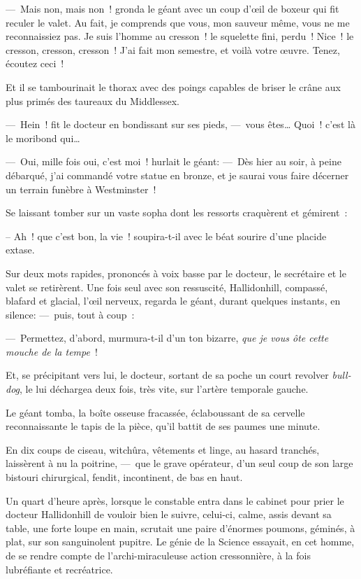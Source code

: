 \documentclass[french,twoside]{book} %
\begin{document}
— Mais non, mais non ! gronda le géant avec un coup d’œil de boxeur qui fit reculer le valet. Au fait, je comprends que vous, mon sauveur même, vous ne me reconnaissiez pas. Je suis l’homme au cresson ! le squelette fini, perdu ! Nice ! le cresson, cresson, cresson ! J’ai fait mon semestre, et voilà votre œuvre. Tenez, écoutez ceci !\par
Et il se tambourinait le thorax avec des poings capables de briser le crâne aux plus primés des taureaux du Middlessex.\par
— Hein ! fit le docteur en bondissant sur ses pieds, — vous êtes… Quoi ! c’est là le moribond qui…\par
— Oui, mille fois oui, c’est moi ! hurlait le géant: — Dès hier au soir, à peine débarqué, j’ai commandé votre statue en bronze, et je saurai vous faire décerner un terrain funèbre à Westminster !\par
Se laissant tomber sur un vaste sopha dont les ressorts craquèrent et gémirent :\par
   – Ah ! que c’est bon, la vie ! soupira-t-il avec le béat sourire d’une placide extase.\par
Sur deux mots rapides, prononcés à voix basse par le docteur, le secrétaire et le valet se retirèrent. Une fois seul avec son ressuscité, Hallidonhill, compassé, blafard et glacial, l’œil nerveux, regarda le géant, durant quelques instants, en silence: — puis, tout à coup :\par
— Permettez, d’abord, murmura-t-il d’un ton bizarre, \emph{que je vous ôte cette mouche de la tempe} !\par
Et, se précipitant vers lui, le docteur, sortant de sa poche un court revolver \emph{bull-dog}, le lui déchargea deux fois, très vite, sur l’artère temporale gauche.\par
Le géant tomba, la boîte osseuse fracassée, éclaboussant de sa cervelle reconnaissante le tapis de la pièce, qu’il battit de ses paumes une minute.\par
En dix coups de ciseau, witchûra, vêtements et linge, au hasard tranchés, laissèrent à nu la poitrine, — que le grave opérateur, d’un seul coup de son large bistouri chirurgical, fendit, incontinent, de bas en haut.\par
   Un quart d’heure après, lorsque le constable entra dans le cabinet pour prier le docteur Hallidonhill de vouloir bien le suivre, celui-ci, calme, assis devant sa table, une forte loupe en main, scrutait une paire d’énormes poumons, géminés, à plat, sur son sanguinolent pupitre. Le génie de la Science essayait, en cet homme, de se rendre compte de l’archi-miraculeuse action cressonnière, à la fois lubréfiante et recréatrice.\par
\end{document}
